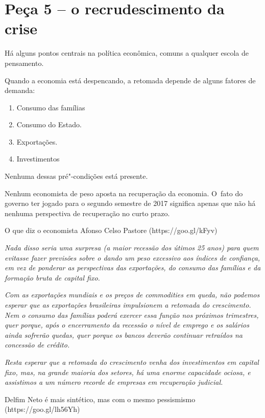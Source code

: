 \section{Peça 5 -- o recrudescimento da crise}

Há alguns pontos centrais na política econômica, comuns a qualquer
escola de pensamento.

Quando a economia está despencando, a retomada depende de alguns fatores
de demanda:

\begin{enumerate}
\itemsep1pt\parskip0pt
\item
  Consumo das famílias
\item
  Consumo do Estado.
\item
  Exportações.
\item
  Investimentos
\end{enumerate}

Nenhuma dessas pré"-condições está presente.

Nenhum economista de peso aposta na recuperação da economia. O~fato do
governo ter jogado para o segundo semestre de 2017 significa apenas que
não há nenhuma perspectiva de recuperação no curto prazo.

O que diz o economista Afonso Celso Pastore (https:/\allowbreak{}/\allowbreak{}goo.gl/\allowbreak{}kFyv)

\emph{Nada disso seria uma surpresa (a maior recessão dos útimos 25
anos) para quem evitasse fazer previsões sobre o  dando um peso
excessivo aos índices de confiança, em vez de ponderar as perspectivas
das exportações, do consumo das famílias e da formação bruta de capital
fixo.}

\emph{Com as exportações mundiais e os preços de commodities em queda,
não podemos esperar que as exportações brasileiras impulsionem a
retomada do crescimento. Nem o consumo das famílias poderá exercer essa
função nos próximos trimestres, quer porque, após o encerramento da
recessão o nível de emprego e os salários ainda sofrerão quedas, quer
porque os bancos deverão continuar retraídos na concessão de crédito.}

\emph{Resta esperar que a retomada do crescimento venha dos
investimentos em capital fixo, mas, na grande maioria dos setores, há
uma enorme capacidade ociosa, e assistimos a um número recorde de
empresas em recuperação judicial.~}

Delfim Neto é mais sintético, mas com o mesmo pessismismo
(https:/\allowbreak{}/\allowbreak{}goo.gl/\allowbreak{}lh56Yh)

